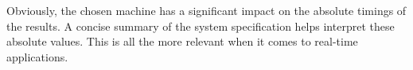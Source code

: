 


\noindent
Obviously, the chosen machine has a significant impact on the absolute timings of the results.
A concise summary of the system specification helps interpret these absolute values.
This is all the more relevant when it comes to real-time applications.
